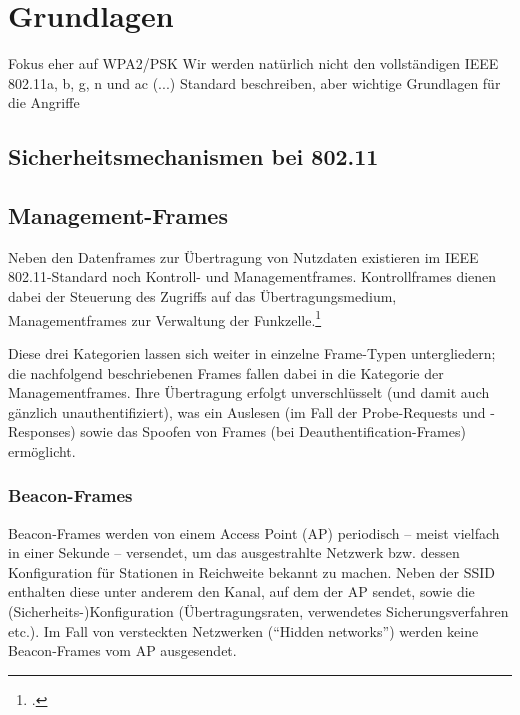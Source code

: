 \section{Grundlagen}
Fokus eher auf WPA2/PSK
Wir werden natürlich nicht den vollständigen IEEE 802.11a, b, g, n und ac (...) Standard beschreiben, aber wichtige Grundlagen für die Angriffe
\subsection{Sicherheitsmechanismen bei 802.11}

\subsection{Management-Frames}
Neben den Datenframes zur Übertragung von Nutzdaten existieren im IEEE 802.11-Standard noch Kontroll- und Managementframes. Kontrollframes dienen dabei der Steuerung des Zugriffs auf das Übertragungsmedium, Managementframes zur Verwaltung der Funkzelle.\footcite[S. 180]{rechWLAN}

Diese drei Kategorien lassen sich weiter in einzelne Frame-Typen untergliedern; die nachfolgend beschriebenen Frames fallen dabei in die Kategorie der Managementframes. Ihre Übertragung erfolgt unverschlüsselt (und damit auch gänzlich unauthentifiziert), was ein Auslesen (im Fall der Probe-Requests und -Responses) sowie das Spoofen von Frames (bei Deauthentification-Frames) ermöglicht.

\subsubsection{Beacon-Frames}
Beacon-Frames werden von einem Access Point (AP) periodisch -- meist vielfach in einer Sekunde -- versendet, um das ausgestrahlte Netzwerk bzw. dessen Konfiguration für Stationen in Reichweite bekannt zu machen. Neben der SSID enthalten diese unter anderem den Kanal, auf dem der AP sendet, sowie die (Sicherheits-)Konfiguration (Übertragungsraten, verwendetes Sicherungsverfahren etc.). Im Fall von versteckten Netzwerken (\enquote{Hidden networks}) werden keine Beacon-Frames vom AP ausgesendet.

